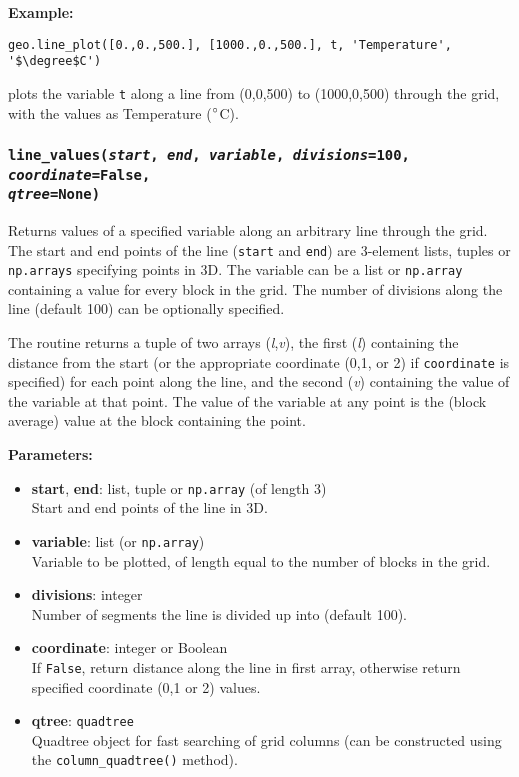 \textbf{Example:}

\begin{lstlisting}
geo.line_plot([0.,0.,500.], [1000.,0.,500.], t, 'Temperature', '$\degree$C')
\end{lstlisting}

plots the variable \texttt{t} along a line from (0,0,500) to (1000,0,500) through the grid, with the values as Temperature ($\degree$C).

\begin{snugshade}\subsubsection{\texttt{line\_values(\emph{start}, \emph{end}, \emph{variable}, \emph{divisions}=100, \emph{coordinate}=\texttt{False},\\
      \emph{qtree}=None)}}\end{snugshade}
\label{sec:mulgrid:line_values}

Returns values of a specified variable along an arbitrary line through the grid.  The start and end points of the line (\texttt{start} and \texttt{end}) are 3-element lists, tuples or \texttt{np.arrays} specifying points in 3D.  The variable can be a list or \texttt{np.array} containing a value for every block in the grid.  The number of divisions along the line (default 100) can be optionally specified.

The routine returns a tuple of two arrays (\emph{l},\emph{v}), the first (\emph{l}) containing the distance from the start (or the appropriate coordinate (0,1, or 2) if \texttt{coordinate} is specified) for each point along the line, and the second (\emph{v}) containing the value of the variable at that point.  The value of the variable at any point is the (block average) value at the block containing the point.


\textbf{Parameters:}
\begin{itemize}
\item \textbf{start}, \textbf{end}: list, tuple or \texttt{np.array} (of length 3)\\
  Start and end points of the line in 3D.
\item \textbf{variable}: list (or \texttt{np.array})\\
  Variable to be plotted, of length equal to the number of blocks in the grid.
\item \textbf{divisions}: integer\\
  Number of segments the line is divided up into (default 100).
\item \textbf{coordinate}: integer or Boolean\\
  If \texttt{False}, return distance along the line in first array, otherwise return specified coordinate (0,1 or 2) values.
\item \textbf{qtree}: \texttt{quadtree}\\
  Quadtree object for fast searching of grid columns (can be constructed using the \texttt{column\_quadtree()} method).
\end{itemize}

